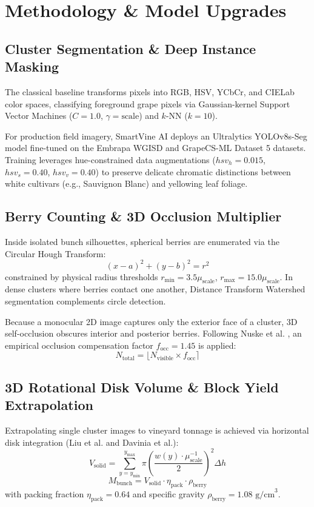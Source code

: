 \documentclass[conference]{IEEEtran}
\begin{document}
\section{Methodology \& Model Upgrades}

\subsection{Cluster Segmentation \& Deep Instance Masking}
The classical baseline transforms pixels into RGB, HSV, YCbCr, and CIELab color spaces, classifying foreground grape pixels via Gaussian-kernel Support Vector Machines ($C=1.0$, $\gamma=\text{scale}$) and $k$-NN ($k=10$). 

For production field imagery, SmartVine AI deploys an Ultralytics YOLOv8s-Seg model fine-tuned on the Embrapa WGISD \cite{santos2020grape} and GrapeCS-ML Dataset 5 datasets. Training leverages hue-constrained data augmentations ($hsv_h = 0.015$, $hsv_s = 0.40$, $hsv_v = 0.40$) to preserve delicate chromatic distinctions between white cultivars (e.g., Sauvignon Blanc) and yellowing leaf foliage.

\subsection{Berry Counting \& 3D Occlusion Multiplier}
Inside isolated bunch silhouettes, spherical berries are enumerated via the Circular Hough Transform:
\begin{equation}
(x - a)^2 + (y - b)^2 = r^2
\end{equation}
constrained by physical radius thresholds $r_{\min} = 3.5\mu_{\text{scale}}$, $r_{\max} = 15.0\mu_{\text{scale}}$. In dense clusters where berries contact one another, Distance Transform Watershed segmentation complements circle detection.

Because a monocular 2D image captures only the exterior face of a cluster, 3D self-occlusion obscures interior and posterior berries. Following Nuske et al. \cite{nuske2014automated}, an empirical occlusion compensation factor $f_{\text{occ}} = 1.45$ is applied:
\begin{equation}
N_{\text{total}} = \lfloor N_{\text{visible}} \times f_{\text{occ}} \rceil
\end{equation}

\subsection{3D Rotational Disk Volume \& Block Yield Extrapolation}
Extrapolating single cluster images to vineyard tonnage is achieved via horizontal disk integration (Liu et al. and Davinia et al.):
\begin{equation}
V_{\text{solid}} = \sum_{y=y_{\min}}^{y_{\max}} \pi \left(\frac{w(y) \cdot \mu_{\text{scale}}^{-1}}{2}\right)^2 \Delta h
\end{equation}
\begin{equation}
M_{\text{bunch}} = V_{\text{solid}} \cdot \eta_{\text{pack}} \cdot \rho_{\text{berry}}
\end{equation}
with packing fraction $\eta_{\text{pack}} = 0.64$ and specific gravity $\rho_{\text{berry}} = 1.08\text{ g/cm}^3$.
\end{document}
